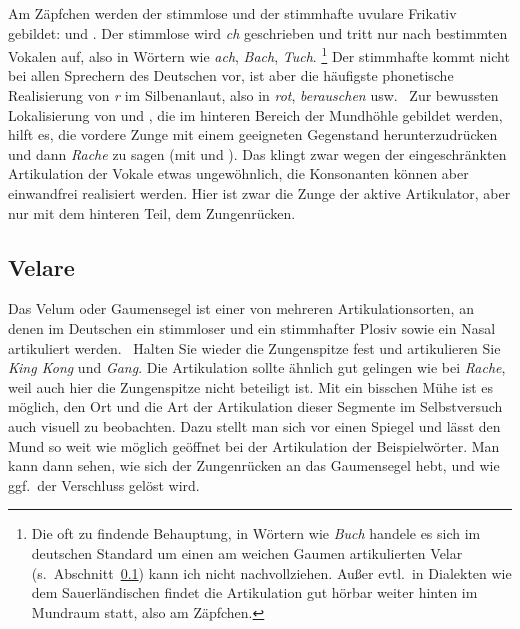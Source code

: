 \label{sec:uvulare}


Am Zäpfchen werden der stimmlose und der stimmhafte uvulare Frikativ gebildet: \textipa{[X]} und \textipa{[K]}.
Der stimmlose wird \textit{ch} geschrieben und tritt nur nach bestimmten Vokalen auf, also in Wörtern wie \textit{ach}, \textit{Bach}, \textit{Tuch}.%
\footnote{Die oft zu findende Behauptung, in Wörtern wie \textit{Buch} handele es sich im deutschen Standard um einen am weichen Gaumen artikulierten Velar \textipa{[x]} (s.\ Abschnitt~\ref{sec:velare}) kann ich nicht nachvollziehen.
Außer evtl.\ in Dialekten wie dem Sauerländischen findet die Artikulation gut hörbar weiter hinten im Mundraum statt, also am Zäpfchen.
}
Der stimmhafte kommt nicht bei allen Sprechern des Deutschen vor, ist aber die häufigste phonetische Realisierung von \textit{r} im Silbenanlaut, also in \textit{rot}, \textit{berauschen} usw.
\TuBegin~Zur bewussten Lokalisierung von \textipa{[X]} und \textipa{[K]}, die im hinteren Bereich der Mundhöhle gebildet werden, hilft es, die vordere Zunge mit einem geeigneten Gegenstand herunterzudrücken und dann \zB \textit{Rache} zu sagen (mit \textipa{[K]} und \textipa{[X]}).
Das klingt zwar wegen der eingeschränkten Artikulation der Vokale etwas ungewöhnlich, die Konsonanten können aber einwandfrei realisiert werden.
Hier ist zwar die Zunge der aktive Artikulator, aber nur mit dem hinteren Teil, dem Zungenrücken.

\subsection{Velare}

\label{sec:velare}


Das Velum oder Gaumensegel ist einer von mehreren Artikulationsorten, an denen im Deutschen ein stimmloser und ein stimmhafter Plosiv sowie ein Nasal artikuliert werden.
\TuBegin~Halten Sie wieder die Zungenspitze fest und artikulieren Sie \textit{King Kong} und \textit{Gang}.
Die Artikulation sollte ähnlich gut gelingen wie bei \textit{Rache}, weil auch hier die Zungenspitze nicht beteiligt ist.
Mit ein bisschen Mühe ist es möglich, den Ort und die Art der Artikulation dieser Segmente im Selbstversuch auch visuell zu beobachten.
Dazu stellt man sich vor einen Spiegel und lässt den Mund so weit wie möglich geöffnet bei der Artikulation der Beispielwörter.
Man kann dann sehen, wie sich der Zungenrücken an das Gaumensegel hebt, und wie ggf.\ der Verschluss gelöst wird.

